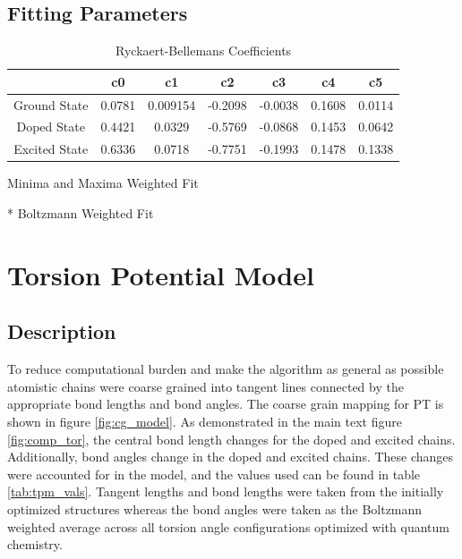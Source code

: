 \subsection{Fitting Parameters}
\begin{table}[hbt!]\centering
\caption{Ryckaert-Bellemans Coefficients}
\renewcommand{\arraystretch}{1.5}
\begin{threeparttable}
\begin{tabular}{ccccccc}\toprule
\multicolumn{1}{c}{\multirow{1}{3.5cm}{\centering}} &
\multicolumn{1}{c}{\multirow{1}{1.5cm}{\centering c0}} &
\multicolumn{1}{c}{\multirow{1}{1.5cm}{\centering c1}} &
\multicolumn{1}{c}{\multirow{1}{1.5cm}{\centering c2}} &
\multicolumn{1}{c}{\multirow{1}{1.5cm}{\centering c3}} &
\multicolumn{1}{c}{\multirow{1}{1.5cm}{\centering c4}} &
\multicolumn{1}{c}{\multirow{1}{1.5cm}{\centering c5}} \\ \midrule
    Ground State\tnote{\textdagger} & 0.0781 & 0.009154 & -0.2098 & -0.0038 & 0.1608 & 0.0114\\
    Doped State\tnote{*} & 0.4421 & 0.0329 & -0.5769 & -0.0868 & 0.1453 & 0.0642\\
    Excited State\tnote{*} & 0.6336 & 0.0718 & -0.7751 & -0.1993 & 0.1478 & 0.1338\\ \bottomrule
\end{tabular}
\begin{tablenotes}
\item[\textdagger] \footnotesize Minima and Maxima Weighted Fit
\item[*] \footnotesize Boltzmann Weighted Fit
\end{tablenotes}
\end{threeparttable}
\end{table}

\section{Torsion Potential Model}
\label{sec:TPM}
\subsection{Description}
To reduce computational burden and make the algorithm as general as possible atomistic chains were coarse grained into tangent lines connected by the appropriate bond lengths and bond angles. The coarse grain mapping for PT is shown in figure \ref{fig:cg_model}. As demonstrated in the main text figure \ref{fig:comp_tor}, the central bond length changes for the doped and excited chains. Additionally, bond angles change in the doped and excited chains. These changes were accounted for in the model, and the values used can be found in table \ref{tab:tpm_vals}. Tangent lengths and bond lengths were taken from the initially optimized structures whereas the bond angles were taken as the Boltzmann weighted average across all torsion angle configurations optimized with quantum chemistry.

